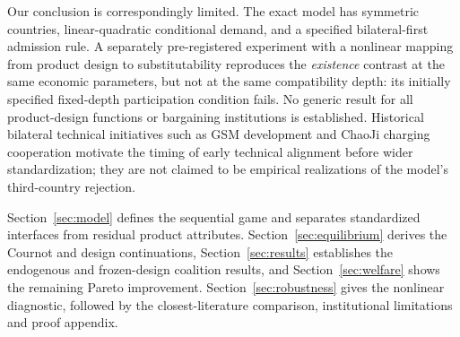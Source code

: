 Our conclusion is correspondingly limited.
The exact model has symmetric countries,
linear-quadratic conditional demand, and
a specified bilateral-first admission rule.
A separately pre-registered experiment with
a nonlinear mapping from product design to
substitutability reproduces the \emph{existence}
contrast at the same economic parameters,
but not at the same compatibility depth:
its initially specified fixed-depth participation
condition fails. No generic result for all
product-design functions or bargaining
institutions is established. Historical
bilateral technical initiatives such as
GSM development and ChaoJi charging cooperation
motivate the timing of early technical alignment
before wider standardization; they are not
claimed to be empirical realizations of the
model's third-country rejection.

Section~\ref{sec:model} defines the
sequential game and separates standardized
interfaces from residual product attributes.
Section~\ref{sec:equilibrium} derives the
Cournot and design continuations,
Section~\ref{sec:results} establishes
the endogenous and frozen-design
coalition results, and Section~\ref{sec:welfare}
shows the remaining Pareto improvement.
Section~\ref{sec:robustness} gives the
nonlinear diagnostic, followed by the
closest-literature comparison, institutional
limitations and proof appendix.
